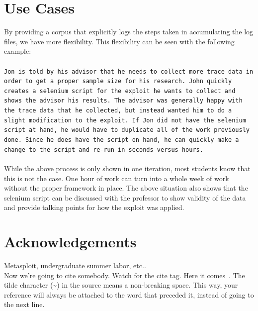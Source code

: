 \documentclass[letterpaper,twocolumn,10pt]{article}
\begin{document}
\section{Use Cases}
By providing a corpus that explicitly logs the steps taken in accumulating the log files, we have more flexibility.  This flexibility can be seen with the following example:  
\\\\
{\tt Jon is told by his advisor that he needs to collect more trace data in order to get a proper sample size for his research.  John quickly creates a selenium script for the exploit he wants to collect and shows the advisor his results.  The advisor was generally happy with the trace data that he collected, but instead wanted him to do a slight modification to the exploit.  If Jon did not have the selenium script at hand, he would have to duplicate all of the work previously done.  Since he does have the script on hand, he can quickly make a change to the script and re-run in seconds versus hours.}
\\\\
While the above process is only shown in one iteration, most students know that this is not the case.  One hour of work can turn into a whole week of work without the proper framework in place.  The above situation also shows that the selenium script can be discussed with the professor to show validity of the data and provide talking points for how the exploit was applied.


\section{Acknowledgements}

Metasploit, undergraduate summer labor, etc..\\
Now we're going to cite somebody.  Watch for the cite tag.
Here it comes~.  The tilde character (\~{})
in the source means a non-breaking space.  This way, your reference will
always be attached to the word that preceded it, instead of going to the
next line.
\end{document}
